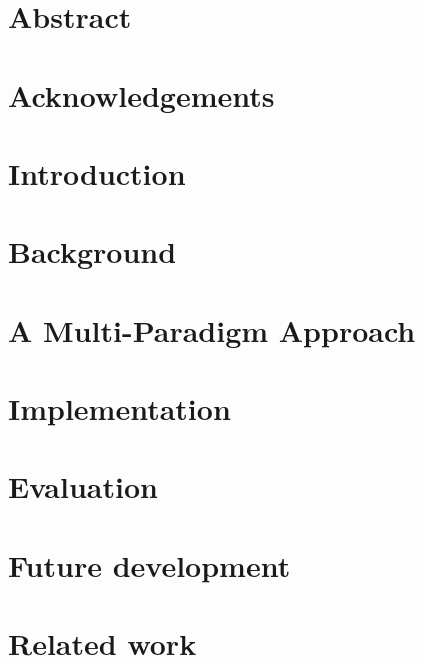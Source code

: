 \documentclass{article}
\begin{document}

\clearpage

\section*{Abstract}
\clearpage

\section*{Acknowledgements}
\clearpage

\tableofcontents
\clearpage

\section{Introduction}
\label{sec:intro}


\section{Background}
\label{sec:background}


\section{A Multi-Paradigm Approach}
\label{sec:design}


\section{Implementation}
\label{sec:implementation}


\section{Evaluation}


\section{Future development}

\section{Related work}
\label{sec:related}

\end{document}
